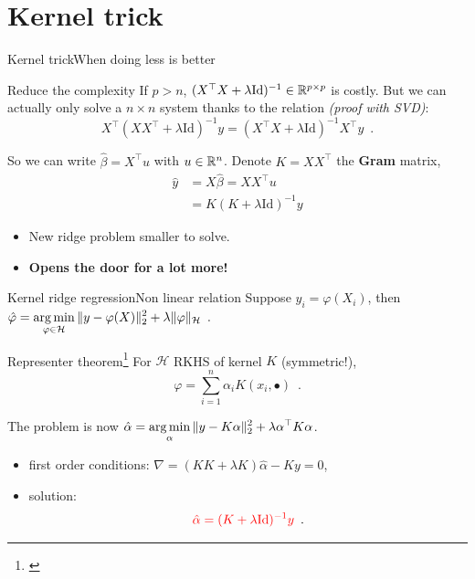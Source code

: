 \documentclass[10pt,aspectratio=43]{beamer}
\begin{document}
\section{Kernel trick}

\begin{frame}{Kernel trick}{When doing less is better}
    \begin{block}{Reduce the complexity}
        If $p>n$, $(X^\top X + \lambda \mathrm{Id})^{-1}\in\mathbb{R}^{p\times p}$ is costly.
        But we can actually only solve a $n\times n$ system thanks to the relation \emph{(proof with SVD)}:
        \[X^\top (X X^\top + \lambda \mathrm{Id})^{-1}y = (X^\top X + \lambda \mathrm{Id})^{-1}X^\top y\enspace.\]
    \end{block}
    \pause
    So we can write $\hat \beta = X^\top u$ with $u\in\mathbb{R}^{n}$. Denote $K=XX^\top$ the \textbf{Gram} matrix,
    \begin{align*}
        \hat y &= X\hat\beta = XX^\top u \\
               &= K(K + \lambda \mathrm{Id})^{-1}y
    \end{align*}

    \begin{itemize}
        \item New ridge problem smaller to solve.
        \item \textbf{Opens the door for a lot more!}
    \end{itemize}
\end{frame}

\begin{frame}{Kernel ridge regression}{Non linear relation}
Suppose $y_i=\varphi(X_i)$, then
 $\hat\varphi = \displaystyle\mathop{\mathrm{arg\,min}}_{\varphi\in\mathcal{H}} \|y-\varphi(X)\|^2_2 + \lambda \|\varphi\|_\mathcal{H}\enspace.$
 \begin{block}{Representer theorem\footnote[frame]{\citet{scholkopf2001generalized}}}
        For $\mathcal{H}$ RKHS of kernel $K$ (symmetric!),
     \[\varphi = \sum_{i=1}^n \alpha_i K(x_i, \bullet)\enspace.\]
 \end{block}
 \pause
 The problem is now $\hat\alpha = \displaystyle\mathop{\mathrm{arg\,min}}_{\alpha} \|y-K\alpha\|^2_2 + \lambda \alpha^\top K \alpha$.
 \begin{itemize}
     \item first order conditions: $\nabla=(KK + \lambda K)\hat\alpha - Ky = 0$,
     \item solution: \[\textcolor{red}{\hat\alpha = (K+\lambda\mathrm{Id})^{-1}y} \enspace.\]
 \end{itemize}
\end{frame}
\end{document}
